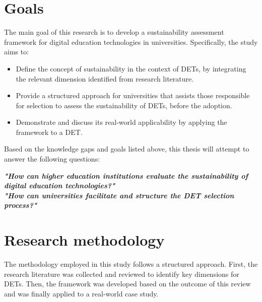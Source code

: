 \section{Goals}
The main goal of this research is to develop a sustainability assessment framework for digital education technologies in universities. Specifically, the study aims to:
\begin{itemize}[noitemsep, topsep=4pt, parsep=0pt, partopsep=0pt]
\item Define the concept of sustainability in the context of DETs, by integrating the relevant dimension identified from research literature.
\item Provide a structured approach for universities that assists those responsible for selection to assess the sustainability of DETs, before the adoption.
\item Demonstrate and discuss its real-world applicability by applying the framework to a DET.
\end{itemize}
Based on the knowledge gaps and goals listed above, this thesis will attempt to answer the following questions:
\begin{center}
    \textit{\textbf{"How can higher education institutions evaluate the sustainability of digital education technologies?"}} \\
    \textit{\textbf{"How can universities facilitate and structure the DET selection process?"}}
\end{center}


\section{Research methodology}
The methodology employed in this study follows a structured approach. First, the research literature was collected and reviewed to identify key dimensions for DETs. Then, the framework was developed based on the outcome of this review and was finally applied to a real-world case study. 

